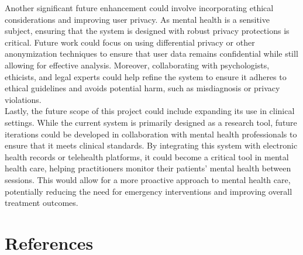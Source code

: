 \noindent
Another significant future enhancement could involve incorporating ethical considerations and improving user privacy. As mental health is a sensitive subject, ensuring that the system is designed with robust privacy protections is critical. Future work could focus on using differential privacy or other anonymization techniques to ensure that user data remains confidential while still allowing for effective analysis. Moreover, collaborating with psychologists, ethicists, and legal experts could help refine the system to ensure it adheres to ethical guidelines and avoids potential harm, such as misdiagnosis or privacy violations. \\

\noindent
Lastly, the future scope of this project could include expanding its use in clinical settings. While the current system is primarily designed as a research tool, future iterations could be developed in collaboration with mental health professionals to ensure that it meets clinical standards. By integrating this system with electronic health records or telehealth platforms, it could become a critical tool in mental health care, helping practitioners monitor their patients’ mental health between sessions. This would allow for a more proactive approach to mental health care, potentially reducing the need for emergency interventions and improving overall treatment outcomes.




 \pagebreak

\section{References}

\vspace{-6em}
\noindent
\renewcommand{\refname}{} %








